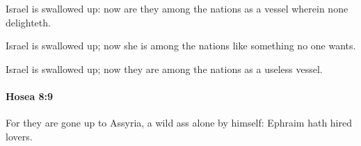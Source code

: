 			\begin{versebox}
					\item[BHS] 
					\item[LXX] 
					\item[ASV] Israel is swallowed up: now are they among the nations as a vessel wherein none delighteth.
					\item[NIV] Israel is swallowed up; now she is among the nations like something no one wants.
					\item[NRSV] Israel is swallowed up; now they are among the nations as a useless vessel.
			\end{versebox}

		\paragraph{Hosea 8:9} %
			\label{HOSEA-8-9}

			For they are gone up to Assyria, a wild ass alone by himself: Ephraim hath hired lovers.

